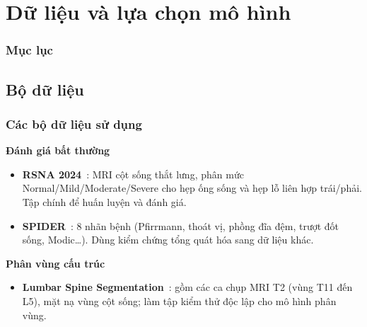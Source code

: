 \documentclass{beamer}
\numberwithin{figure}{section}
\numberwithin{table}{section}
\begin{document}

\section{Dữ liệu và lựa chọn mô hình}
{
    \begin{frame}
        \frametitle{Mục lục}
    \end{frame}
}

\subsection{Bộ dữ liệu}
\begin{frame}
\frametitle{Các bộ dữ liệu sử dụng}
\textbf{Đánh giá bất thường}
\begin{itemize}\small
    \item[--] \textbf{RSNA 2024}~\cite{rsna2024dataset}: MRI cột sống thắt lưng, phân mức Normal/Mild/Moderate/Severe cho hẹp ống sống và hẹp lỗ liên hợp trái/phải. Tập chính để huấn luyện và đánh giá.
    \item[--] \textbf{SPIDER}~\cite{vansluijs2022spider}: 8 nhãn bệnh (Pfirrmann, thoát vị, phồng đĩa đệm, trượt đốt sống, Modic\ldots). Dùng kiểm chứng tổng quát hóa sang dữ liệu khác.
\end{itemize}
\vspace{0.3em}
\textbf{Phân vùng cấu trúc}
\begin{itemize}\small
    \item[--] \textbf{Lumbar Spine Segmentation}~\cite{chu2015dataset}: gồm các ca chụp MRI T2 (vùng T11 đến L5), mặt nạ vùng cột sống; làm tập kiểm thử độc lập cho mô hình phân vùng.
\end{itemize}
\end{frame}
\end{document}
